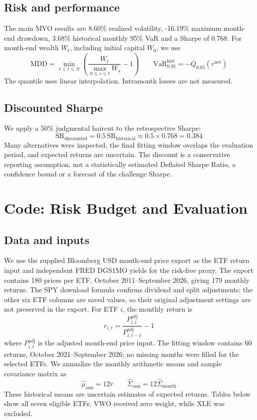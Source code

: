 \documentclass[10pt,a4paper]{article}
\begin{document}
\subsection{Risk and performance}
The main MVO results are 8.60\% realized volatility, -16.19\% maximum month-end drawdown, 3.68\% historical monthly 95\% VaR and a Sharpe of 0.768. For month-end wealth $W_t$, including initial capital $W_0$, we use
\[
\mathrm{MDD}=\min_{1\leq t\leq N}\left(\frac{W_t}{\max_{0\leq s\leq t}W_s}-1\right)
\qquad
\mathrm{VaR}^{\mathrm{hist}}_{0.95}=-Q_{0.05}(r^{\mathrm{net}})
\]
The quantile uses linear interpolation. Intramonth losses are not measured.

\subsection{Discounted Sharpe}
We apply a 50\% judgmental haircut to the retrospective Sharpe:
\[
\mathrm{SR}_{\mathrm{discounted}}=0.5\,\mathrm{SR}_{\mathrm{historical}}
\approx0.5\times0.768=0.384
\] Many alternatives were inspected, the final fitting window overlaps the evaluation period, and expected returns are uncertain. The discount is a conservative reporting assumption, not a statistically estimated Deflated Sharpe Ratio, a confidence bound or a forecast of the challenge Sharpe.


\clearpage
\section{Code: Risk Budget and Evaluation}\label{sec:code}
\subsection{Data and inputs}
We use the supplied Bloomberg USD month-end price export as the ETF return input and independent FRED DGS1MO yields for the risk-free proxy. The export contains 180 prices per ETF, October 2011--September 2026, giving 179 monthly returns. The SPY download formula confirms dividend and split adjustments; the other six ETF columns are saved values, so their original adjustment settings are not preserved in the export. For ETF $i$, the monthly return is
\[
r_{i,t}=\frac{P^{\mathrm{adj}}_{i,t}}{P^{\mathrm{adj}}_{i,t-1}}-1
\]
where $P^{\mathrm{adj}}_{i,t}$ is the adjusted month-end price input. The fitting window contains 60 returns, October 2021--September 2026; no missing months were filled for the selected ETFs. We annualize the monthly arithmetic means and sample covariance matrix as
\[
\widehat\mu_{\mathrm{ann}}=12\bar r\qquad
\widehat\Sigma_{\mathrm{ann}}=12\widehat\Sigma_{\mathrm{month}}
\]
These historical means are uncertain estimates of expected returns. Tables below show all seven eligible ETFs; VWO received zero weight, while XLE was excluded.
\end{document}
